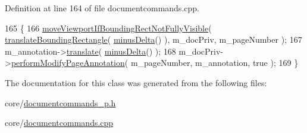 Definition at line 164 of file documentcommands.\+cpp.


\begin{DoxyCode}
165 \{
166     \hyperlink{namespaceOkular_a1e0f22fec5a200bd3b1835b7bfd95172}{moveViewportIfBoundingRectNotFullyVisible}(
      \hyperlink{classOkular_1_1TranslateAnnotationCommand_a17f23b2efa81ea8a62a3b7e1d5040b5c}{translateBoundingRectangle}(  \hyperlink{classOkular_1_1TranslateAnnotationCommand_aa72dd06b02d8f54e358aef6749666b42}{minusDelta}() ), m\_docPriv, m\_pageNumber );
167     m\_annotation->\hyperlink{classOkular_1_1Annotation_ae0ef33b85b6049645b7a94fd97984d52}{translate}( \hyperlink{classOkular_1_1TranslateAnnotationCommand_aa72dd06b02d8f54e358aef6749666b42}{minusDelta}() );
168     m\_docPriv->\hyperlink{classOkular_1_1DocumentPrivate_ac6a83ec146be14eee48aa70ac02f7350}{performModifyPageAnnotation}( m\_pageNumber,  m\_annotation, \textcolor{keyword}{true} );
169 \}
\end{DoxyCode}


The documentation for this class was generated from the following files\+:\begin{DoxyCompactItemize}
\item 
core/\hyperlink{documentcommands__p_8h}{documentcommands\+\_\+p.\+h}\item 
core/\hyperlink{documentcommands_8cpp}{documentcommands.\+cpp}\end{DoxyCompactItemize}
